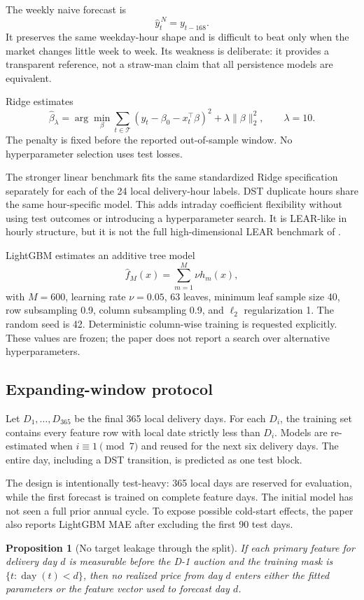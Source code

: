\documentclass[11pt]{article}
\newtheorem{proposition}{Proposition}
\begin{document}
The weekly naive forecast is
\[
  \widehat y^{\,N}_t=y_{t-168}.
\]
It preserves the same weekday-hour shape and is difficult to beat only when
the market changes little week to week.  Its weakness is deliberate: it
provides a transparent reference, not a straw-man claim that all persistence
models are equivalent.

Ridge estimates
\[
  \widehat\beta_\lambda
  =\arg\min_{\beta}\sum_{t\in\mathcal T}
    (y_t-\beta_0-x_t^\top\beta)^2+\lambda\|\beta\|_2^2,
  \qquad \lambda=10.
\]
The penalty is fixed before the reported out-of-sample window.  No
hyperparameter selection uses test losses.

The stronger linear benchmark fits the same standardized Ridge specification
separately for each of the 24 local delivery-hour labels. DST duplicate hours
share the same hour-specific model. This adds intraday coefficient flexibility
without using test outcomes or introducing a hyperparameter search. It is
LEAR-like in hourly structure, but it is not the full high-dimensional LEAR
benchmark of \cite{lago2021}.

LightGBM estimates an additive tree model
\[
  \widehat f_M(x)=\sum_{m=1}^{M}\nu h_m(x),
\]
with $M=600$, learning rate $\nu=0.05$, 63 leaves, minimum leaf sample size
40, row subsampling 0.9, column subsampling 0.9, and $\ell_2$ regularization
1.  The random seed is 42.  Deterministic column-wise training is requested
explicitly.  These values are frozen; the paper does not report a search over
alternative hyperparameters.

\subsection{Expanding-window protocol}

Let $D_1,\ldots,D_{365}$ be the final 365 local delivery days.  For each
$D_i$, the training set contains every feature row with local date strictly
less than $D_i$.  Models are re-estimated when $i\equiv1\pmod 7$ and reused
for the next six delivery days.  The entire day, including a DST transition,
is predicted as one test block.

The design is intentionally test-heavy: 365 local days are reserved for
evaluation, while the first forecast is trained on
\InitialTrainingDays{} complete feature days. The initial model has not seen
a full prior annual cycle. To expose possible cold-start effects, the paper
also reports LightGBM MAE after excluding the first 90 test days.

\begin{proposition}[No target leakage through the split]
If each primary feature for delivery day $d$ is measurable before the D-1
auction and the training mask is $\{t:\operatorname{day}(t)<d\}$, then no
realized price from day $d$ enters either the fitted parameters or the feature
vector used to forecast day $d$.
\end{proposition}
\end{document}
